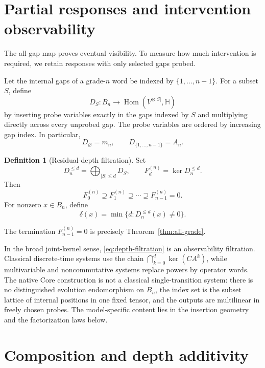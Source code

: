 \documentclass[11pt]{article}
\theoremstyle{definition}
\newtheorem{definition}[theorem]{Definition}
\theoremstyle{remark}
\newcommand{\Hq}{\mathbb H}
\newcommand{\Hom}{\operatorname{Hom}}
\newcommand{\depth}{\delta}
\begin{document}
\section{Partial responses and intervention observability}\label{sec:partial}

The all-gap map proves eventual visibility.  To measure how much intervention is required, we retain responses with only selected gaps probed.

Let the internal gaps of a grade-$n$ word be indexed by $\{1,\ldots,n-1\}$.  For a subset $S$, define
\[
  D_S:B_n\longrightarrow\Hom(V^{\otimes|S|},\Hq)
\]
by inserting probe variables exactly in the gaps indexed by $S$ and multiplying directly across every unprobed gap.  The probe variables are ordered by increasing gap index.  In particular,
\[
  D_\varnothing=m_n,
  \qquad
  D_{\{1,\ldots,n-1\}}=A_n.
\]

\begin{definition}[Residual-depth filtration]
Set
\begin{equation}\label{eq:depth-filtration}
  D_n^{\le d}=\bigoplus_{|S|\le d}D_S,
  \qquad
  F_d^{(n)}=\ker D_n^{\le d}.
\end{equation}
Then
\[
  F_0^{(n)}\supseteq F_1^{(n)}\supseteq\cdots\supseteq F_{n-1}^{(n)}=0.
\]
For nonzero $x\in B_n$, define
\begin{equation}\label{eq:first-depth}
  \depth(x)=\min\{d:D_n^{\le d}(x)\ne0\}.
\end{equation}
\end{definition}

The termination $F_{n-1}^{(n)}=0$ is precisely Theorem~\ref{thm:all-grade}.

In the broad joint-kernel sense, \eqref{eq:depth-filtration} is an observability filtration.  Classical discrete-time systems use the chain $\bigcap_{k=0}^d\ker(CA^k)$, while multivariable and noncommutative systems replace powers by operator words.  The native Core construction is not a classical single-transition system: there is no distinguished evolution endomorphism on $B_n$, the index set is the subset lattice of internal positions in one fixed tensor, and the outputs are multilinear in freely chosen probes.  The model-specific content lies in the insertion geometry and the factorization laws below.

\section{Composition and depth additivity}\label{sec:depth}
\end{document}
